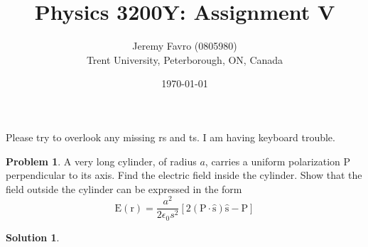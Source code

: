 \documentclass[10pt]{article}
\title{Physics 3200Y: Assignment V}
\author{Jeremy Favro (0805980) \\ Trent University, Peterborough, ON, Canada}
\date{\today}
\theoremstyle{definition}
\newtheorem{problem}{Problem}
\newtheorem{soln}{Solution}
\newcommand{\uv}[1]{\hat{\bv{{#1}}}}
\newcommand{\bv}[1]{\bm{\mathrm{#1}}}
\begin{document}
\maketitle
Please try to overlook any missing rs and ts. I am having keyboard trouble.
\begin{problem}
A very long cylinder, of radius $a$, carries a uniform polarization $\bv{P}$ perpendicular to its axis. Find the electric field inside the cylinder. Show that
the field outside the cylinder can be expressed in the form
$$\bv{E}(\bv{r})=\frac{a^2}{2\epsilon_0s^2}\left[2(\bv{P}\cdot\uv{s})\uv{s}-\bv{P}\right]$$
\end{problem}
\begin{soln}




\end{soln}
\end{document}
